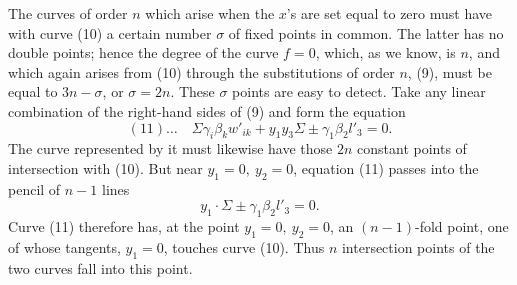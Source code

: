 \documentclass[10pt]{article}
\begin{document}
The curves of order \(n\) which arise when the \(x\)'s are set equal to zero must have with curve (10) a certain number \(\sigma\) of fixed points in common. The latter has no double points; hence the degree of the curve \(f=0\), which, as we know, is \(n\), and which again arises from (10) through the substitutions of order \(n\), (9), must be equal to \(3n-\sigma\), or \(\sigma=2n\). These \(\sigma\) points are easy to detect. Take any linear combination of the right-hand sides of (9) and form the equation
\[
(11)\ldots\quad
\Sigma\gamma_i\beta_kw'_{ik}+y_1y_3\Sigma\pm\gamma_1\beta_2l'_3=0.
\]
The curve represented by it must likewise have those \(2n\) constant points of intersection with (10). But near \(y_1=0,\ y_2=0\), equation (11) passes into the pencil of \(n-1\) lines
\[
y_1\cdot \Sigma\pm\gamma_1\beta_2l'_3=0.
\]
Curve (11) therefore has, at the point \(y_1=0,\ y_2=0\), an \((n-1)\)-fold point, one of whose tangents, \(y_1=0\), touches curve (10). Thus \(n\) intersection points of the two curves fall into this point.
\end{document}
